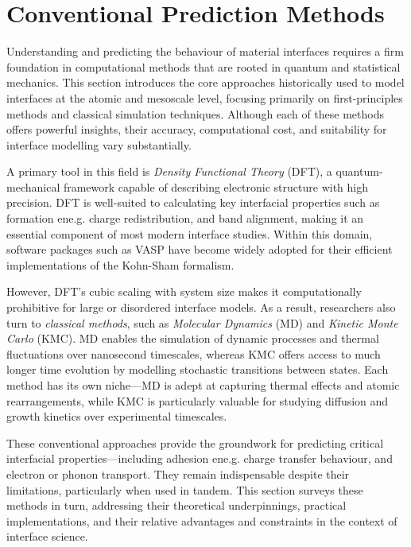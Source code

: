 \section{Conventional Prediction Methods} \label{section:conventional_methods}

Understanding and predicting the behaviour of material interfaces requires a firm foundation in computational methods that are rooted in quantum and statistical mechanics. This section introduces the core approaches historically used to model interfaces at the atomic and mesoscale level, focusing primarily on first-principles methods and classical simulation techniques. Although each of these methods offers powerful insights, their accuracy, computational cost, and suitability for interface modelling vary substantially.

A primary tool in this field is \textit{Density Functional Theory} (DFT), a quantum-mechanical framework capable of describing electronic structure with high precision. DFT is well-suited to calculating key interfacial properties such as formation ene.g. charge redistribution, and band alignment, making it an essential component of most modern interface studies. Within this domain, software packages such as \textsc{VASP} have become widely adopted for their efficient implementations of the Kohn-Sham formalism.

However, DFT's cubic scaling with system size makes it computationally prohibitive for large or disordered interface models. As a result, researchers also turn to \textit{classical methods}, such as \textit{Molecular Dynamics} (MD) and \textit{Kinetic Monte Carlo} (KMC). MD enables the simulation of dynamic processes and thermal fluctuations over nanosecond timescales, whereas KMC offers access to much longer time evolution by modelling stochastic transitions between states. Each method has its own niche---MD is adept at capturing thermal effects and atomic rearrangements, while KMC is particularly valuable for studying diffusion and growth kinetics over experimental timescales.

These conventional approaches provide the groundwork for predicting critical interfacial properties---including adhesion ene.g. charge transfer behaviour, and electron or phonon transport. They remain indispensable despite their limitations, particularly when used in tandem. This section surveys these methods in turn, addressing their theoretical underpinnings, practical implementations, and their relative advantages and constraints in the context of interface science.

